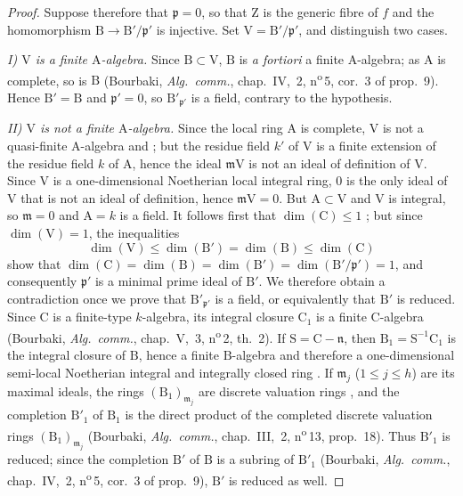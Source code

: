 \begin{proof}
Suppose therefore that $\mathfrak{p}=0$, so that $\mathrm{Z}$ is the generic fibre of $f$ and the homomorphism $\mathrm{B}\to\mathrm{B}'/\mathfrak{p}'$ is injective. Set $\mathrm{V}=\mathrm{B}'/\mathfrak{p}'$, and distinguish two cases.

\emph{I) $\mathrm{V}$ is a finite $\mathrm{A}$-algebra.} Since $\mathrm{B}\subset\mathrm{V}$, $\mathrm{B}$ is \emph{a fortiori} a finite $\mathrm{A}$-algebra; as $\mathrm{A}$ is complete, so is $\mathrm{B}$ (Bourbaki, \emph{Alg.\ comm.}, chap.~IV, \textsection\,2, n\textsuperscript{o}\,5, cor.~3 of prop.~9). Hence $\mathrm{B}'=\mathrm{B}$ and $\mathfrak{p}'=0$, so $\mathrm{B}'_{\mathfrak{p}'}$ is a field, contrary to the hypothesis.

\emph{II) $\mathrm{V}$ is not a finite $\mathrm{A}$-algebra.} Since the local ring $\mathrm{A}$ is complete, $\mathrm{V}$ is not a quasi-finite $\mathrm{A}$-algebra  and ; but the residue field $k'$ of $\mathrm{V}$ is a finite extension of the residue field $k$ of $\mathrm{A}$, hence  the ideal $\mathfrak{m}\mathrm{V}$ is not an ideal of definition of $\mathrm{V}$. Since $\mathrm{V}$ is a one-dimensional Noetherian local integral ring, $0$ is the only ideal of $\mathrm{V}$ that is not an ideal of definition, hence $\mathfrak{m}\mathrm{V}=0$. But $\mathrm{A}\subset\mathrm{V}$ and $\mathrm{V}$ is integral, so $\mathfrak{m}=0$ and $\mathrm{A}=k$ is a field.
It follows first that $\dim(\mathrm{C})\leqslant 1$ ; but since $\dim(\mathrm{V})=1$, the inequalities
\[
  \dim(\mathrm{V})\leqslant\dim(\mathrm{B}')=\dim(\mathrm{B})\leqslant\dim(\mathrm{C})
\]
show that $\dim(\mathrm{C})=\dim(\mathrm{B})=\dim(\mathrm{B}')=\dim(\mathrm{B}'/\mathfrak{p}')=1$, and consequently $\mathfrak{p}'$ is a minimal prime ideal of $\mathrm{B}'$. We therefore obtain a contradiction once we prove that $\mathrm{B}'_{\mathfrak{p}'}$ is a field, or equivalently that $\mathrm{B}'$ is reduced.
Since $\mathrm{C}$ is a finite-type $k$-algebra, its integral closure $\mathrm{C}_1$ is a finite $\mathrm{C}$-algebra (Bourbaki, \emph{Alg.\ comm.}, chap.~V, \textsection\,3, n\textsuperscript{o}\,2, th.~2). If $\mathrm{S}=\mathrm{C}-\mathfrak{n}$, then $\mathrm{B}_1=\mathrm{S}^{-1}\mathrm{C}_1$ is the integral closure of $\mathrm{B}$, hence a finite $\mathrm{B}$-algebra and therefore a one-dimensional semi-local Noetherian integral and integrally closed ring . If $\mathfrak{m}_j$ ($1\leqslant j\leqslant h$) are its maximal ideals, the rings $(\mathrm{B}_1)_{\mathfrak{m}_j}$ are discrete valuation rings , and the completion $\mathrm{B}'_1$ of $\mathrm{B}_1$ is the direct product of the completed discrete valuation rings $(\mathrm{B}_1)_{\mathfrak{m}_j}$ (Bourbaki, \emph{Alg.\ comm.}, chap.~III, \textsection\,2, n\textsuperscript{o}\,13, prop.~18). Thus $\mathrm{B}'_1$ is reduced; since the completion $\mathrm{B}'$ of $\mathrm{B}$ is a subring of $\mathrm{B}'_1$ (Bourbaki, \emph{Alg.\ comm.}, chap.~IV, \textsection\,2, n\textsuperscript{o}\,5, cor.~3 of prop.~9), $\mathrm{B}'$ is reduced as well.
\end{proof}

